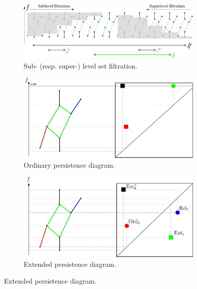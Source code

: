 \begin{figure}[t]
  \centering
  \begin{subfigure}{\linewidth}
    \centering
    \includegraphics[width=\linewidth]{figs/ph/expers_v2.pdf}
    \caption{Sub- (resp. super-) level set filtration.}
    \label{fig:filtrations_top}
  \end{subfigure}

  \vspace{0.5em} %

  \begin{subfigure}{0.48\linewidth}
    \centering
    \includegraphics[width=\linewidth]{figs/ph/expers2_ord_v2.pdf}
    \caption{Ordinary persistence diagram.}
    \label{fig:filtrations_left}
  \end{subfigure}\hfill
  \begin{subfigure}{0.48\linewidth}
    \centering
    \includegraphics[width=\linewidth]{figs/ph/expers2_v2.pdf}
    \caption{Extended persistence diagram.}
    \label{fig:filtrations_right}
  \end{subfigure}


\end{figure}
